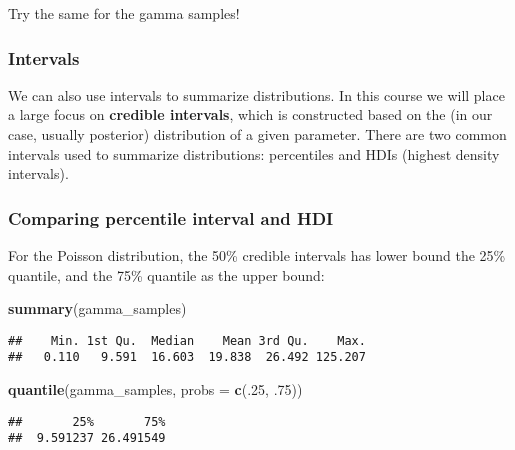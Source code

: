 \documentclass[]{article}
\newenvironment{Shaded}{\begin{snugshade}}{\end{snugshade}}
\newcommand{\KeywordTok}[1]{\textcolor[rgb]{0.13,0.29,0.53}{\textbf{#1}}}
\newcommand{\DataTypeTok}[1]{\textcolor[rgb]{0.13,0.29,0.53}{#1}}
\newcommand{\DecValTok}[1]{\textcolor[rgb]{0.00,0.00,0.81}{#1}}
\newcommand{\NormalTok}[1]{#1}
\begin{document}
Try the same for the gamma samples!

\subsubsection{Intervals}\label{intervals}

We can also use intervals to summarize distributions. In this course we
will place a large focus on \textbf{credible intervals}, which is
constructed based on the (in our case, usually posterior) distribution
of a given parameter. There are two common intervals used to summarize
distributions: percentiles and HDIs (highest density intervals).

\subsubsection{Comparing percentile interval and
HDI}\label{comparing-percentile-interval-and-hdi}

For the Poisson distribution, the 50\% credible intervals has lower
bound the 25\% quantile, and the 75\% quantile as the upper bound:

\begin{Shaded}
\begin{Highlighting}[]
\KeywordTok{summary}\NormalTok{(gamma_samples)}
\end{Highlighting}
\end{Shaded}

\begin{verbatim}
##    Min. 1st Qu.  Median    Mean 3rd Qu.    Max. 
##   0.110   9.591  16.603  19.838  26.492 125.207
\end{verbatim}

\begin{Shaded}
\begin{Highlighting}[]
\KeywordTok{quantile}\NormalTok{(gamma_samples, }\DataTypeTok{probs =} \KeywordTok{c}\NormalTok{(.}\DecValTok{25}\NormalTok{, .}\DecValTok{75}\NormalTok{))}
\end{Highlighting}
\end{Shaded}

\begin{verbatim}
##       25%       75% 
##  9.591237 26.491549
\end{verbatim}
\end{document}
